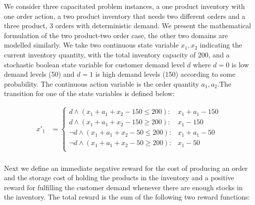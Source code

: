 We consider three capacitated problem instances, a one product inventory with one order action, a two product inventory that needs two different orders and a three product, 3 orders with deterministic demand.
We present the mathematical formulation of the two product-two order case, the other two domains are modelled similarly. We take two continuous state variable $x_1,x_2$ indicating the current inventory quantity, with the total inventory capacity of 200, and a stochastic boolean state variable for customer demand level $d$ where $d=0$ is low demand levels (50) and $d=1$ is high demand levels (150) according to some probability. The continuous action variable is the order quantity $a_1,a_2$.The transition for one of the state variables is defined below:
 
{\footnotesize
\begin{align*}
x'_1 & = \begin{cases}
d \wedge (x_1 + a_1 + x_2 - 150 \leq 200) : & x_1 + a_1 - 150 \\
d \wedge (x_1 + a_1 + x_2 - 150 \geq 200) : & x_1 - 150 \\
\neg d \wedge (x_1 + a_1 + x_2 - 50 \leq 200): & x_1 + a_1 - 50 \\
\neg d \wedge (x_1 + a_1 + x_2 - 50 \geq 200): & x_1 - 50 \\
\end{cases}\\
\end{align*}}

Next we define an immediate negative reward for the cost of producing an order
and the storage cost of holding the products in the inventory and a
positive reward for fulfilling the customer demand whenever there are enough
stocks in the inventory. 
The total reward is the sum of the following two reward functions:
      			
